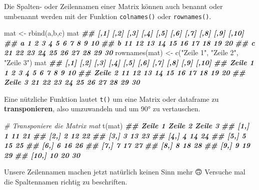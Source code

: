 \documentclass[
]{article}
\newenvironment{Shaded}{\begin{snugshade}}{\end{snugshade}}
\newcommand{\CommentTok}[1]{\textcolor[rgb]{0.56,0.35,0.01}{\textit{#1}}}
\newcommand{\DocumentationTok}[1]{\textcolor[rgb]{0.56,0.35,0.01}{\textbf{\textit{#1}}}}
\newcommand{\FunctionTok}[1]{\textcolor[rgb]{0.00,0.00,0.00}{#1}}
\newcommand{\NormalTok}[1]{#1}
\newcommand{\OtherTok}[1]{\textcolor[rgb]{0.56,0.35,0.01}{#1}}
\newcommand{\StringTok}[1]{\textcolor[rgb]{0.31,0.60,0.02}{#1}}
\begin{document}
Die Spalten- oder Zeilennamen einer Matrix können auch benannt oder umbenannt werden mit der Funktion \texttt{colnames()} oder \texttt{rownames()}.

\begin{Shaded}
\begin{Highlighting}[]
\NormalTok{mat }\OtherTok{\textless{}{-}} \FunctionTok{rbind}\NormalTok{(a,b,c)}
\NormalTok{mat}
\DocumentationTok{\#\#   [,1] [,2] [,3] [,4] [,5] [,6] [,7] [,8] [,9] [,10]}
\DocumentationTok{\#\# a    1    2    3    4    5    6    7    8    9    10}
\DocumentationTok{\#\# b   11   12   13   14   15   16   17   18   19    20}
\DocumentationTok{\#\# c   21   22   23   24   25   26   27   28   29    30}
\FunctionTok{rownames}\NormalTok{(mat) }\OtherTok{\textless{}{-}} \FunctionTok{c}\NormalTok{(}\StringTok{"Zeile 1"}\NormalTok{, }\StringTok{"Zeile 2"}\NormalTok{, }\StringTok{"Zeile 3"}\NormalTok{)}
\NormalTok{mat}
\DocumentationTok{\#\#         [,1] [,2] [,3] [,4] [,5] [,6] [,7] [,8] [,9] [,10]}
\DocumentationTok{\#\# Zeile 1    1    2    3    4    5    6    7    8    9    10}
\DocumentationTok{\#\# Zeile 2   11   12   13   14   15   16   17   18   19    20}
\DocumentationTok{\#\# Zeile 3   21   22   23   24   25   26   27   28   29    30}
\end{Highlighting}
\end{Shaded}

Eine nützliche Funktion lautet \texttt{t()} um eine Matrix oder dataframe zu \textbf{transponieren}, also umzuwandeln und um 90° zu vertauschen.

\begin{Shaded}
\begin{Highlighting}[]
\CommentTok{\# Transponiere die Matrix mat }
\FunctionTok{t}\NormalTok{(mat)}
\DocumentationTok{\#\#       Zeile 1 Zeile 2 Zeile 3}
\DocumentationTok{\#\#  [1,]       1      11      21}
\DocumentationTok{\#\#  [2,]       2      12      22}
\DocumentationTok{\#\#  [3,]       3      13      23}
\DocumentationTok{\#\#  [4,]       4      14      24}
\DocumentationTok{\#\#  [5,]       5      15      25}
\DocumentationTok{\#\#  [6,]       6      16      26}
\DocumentationTok{\#\#  [7,]       7      17      27}
\DocumentationTok{\#\#  [8,]       8      18      28}
\DocumentationTok{\#\#  [9,]       9      19      29}
\DocumentationTok{\#\# [10,]      10      20      30}
\end{Highlighting}
\end{Shaded}

Unsere Zeilennamen machen jetzt natürlich keinen Sinn mehr 🙃 Versuche mal die Spaltennamen richtig zu beschriften.
\end{document}
